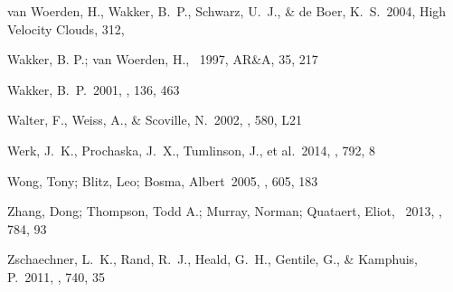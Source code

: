 \documentclass[twocolumn]{aastex62}
\begin{document}
\begin{thebibliography}{999}
 van Woerden, H., Wakker, B.~P., Schwarz, U.~J., \& de Boer, K.~S.\ 2004, High Velocity Clouds, 312, 

 Wakker, B. P.; van Woerden, H., \ 1997, AR\&A, 35, 217 

 Wakker, B.~P.\ 2001, \apjs, 136, 463 


 Walter, F., Weiss, A., \& Scoville, N.\ 2002, \apjl, 580, L21 

 Werk, J.~K., Prochaska, J.~X., Tumlinson, J., et al.\ 2014, \apj, 792, 8

 Wong, Tony; Blitz, Leo; Bosma, Albert\ 2005, \apj, 605, 183 

Zhang, Dong; Thompson, Todd A.; Murray, Norman; Quataert, Eliot, \ 2013, \apj, 784, 93 

 Zschaechner, L.~K., Rand, R.~J., Heald, G.~H., Gentile, G., \& Kamphuis, P.\ 2011, \apj, 740, 35 

\end{thebibliography}
\end{document}
